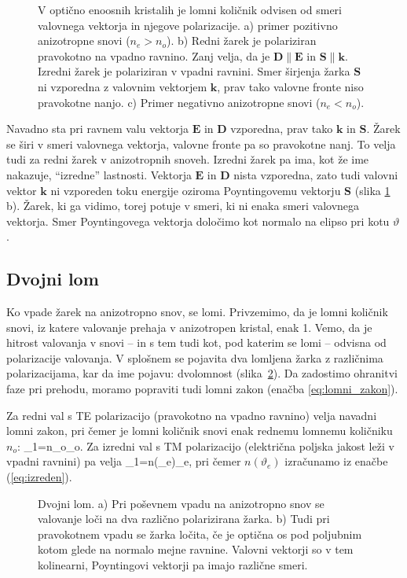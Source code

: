 \begin{figure}[h]
\centering
\def\svgwidth{140truemm} 

\caption{\label{fig:Elipsa}V optično enoosnih kristalih je lomni količnik odvisen
od smeri valovnega vektorja in njegove polarizacije. a) primer pozitivno anizotropne
snovi ($n_e>n_o$). b) Redni žarek je polariziran pravokotno na vpadno ravnino. Zanj velja, 
da je $\mathbf{D} \parallel \mathbf{E}$ in $\mathbf{S} \parallel \mathbf{k}$. Izredni žarek
je polariziran v vpadni ravnini. Smer širjenja žarka $\mathbf{S}$ ni vzporedna z valovnim vektorjem
$\mathbf{k}$,
prav tako valovne fronte niso pravokotne nanjo. c) Primer negativno anizotropne snovi ($n_e< n_o$).}
\end{figure}

Navadno sta pri ravnem valu vektorja $\mathbf{E}$ in $\mathbf{D}$ vzporedna, 
prav tako $\mathbf{k}$ in $\mathbf{S}$. Žarek se širi v smeri valovnega vektorja, 
valovne fronte pa so pravokotne nanj. To velja tudi za redni žarek v anizotropnih
snoveh. Izredni žarek pa ima, kot že ime nakazuje, ``izredne'' lastnosti. Vektorja
$\mathbf{E}$ in $\mathbf{D}$ nista vzporedna, zato tudi valovni vektor $\mathbf{k}$ ni vzporeden
toku energije oziroma Poyntingovemu vektorju $\mathbf{S}$ (slika \ref{fig:Elipsa}\,b). 
Žarek, ki ga vidimo, torej potuje v smeri, ki ni enaka smeri valovnega vektorja. Smer
Poyntingovega vektorja določimo kot normalo na elipso pri kotu $\vartheta$. 

\subsection*{Dvojni lom}
Ko vpade žarek na anizotropno snov, se lomi. Privzemimo, da je lomni količnik snovi,
iz katere valovanje prehaja v anizotropen kristal, enak 1. Vemo, da je hitrost valovanja v 
snovi -- in s tem tudi kot, pod katerim se lomi -- odvisna od polarizacije valovanja. V splošnem
se pojavita dva lomljena žarka z različnima polarizacijama, kar
da ime pojavu: dvolomnost (slika~\ref{fig:dvolomnost}). 
Da zadostimo ohranitvi faze
pri prehodu, moramo popraviti tudi lomni zakon (enačba \ref{eq:lomni_zakon}).

Za redni val s TE polarizacijo (pravokotno na vpadno ravnino) velja navadni lomni zakon, pri čemer
je lomni količnik snovi enak rednemu lomnemu količniku $n_o$:
\beq
\sin\vartheta_{1}=n_{o}\sin\vartheta_{o}.
\eeq
Za izredni val s TM polarizacijo (električna poljska jakost leži v vpadni ravnini) pa velja
\beq
\sin\vartheta_{1}=n(\vartheta_e)\sin\vartheta_{e},
\eeq
pri čemer $n(\vartheta_e)$ izračunamo iz enačbe (\ref{eq:izreden}).
\begin{figure}
\centering
\def\svgwidth{140truemm} 

\caption{\label{fig:dvolomnost}Dvojni lom. a) Pri poševnem vpadu na anizotropno snov se
valovanje loči na dva različno polarizirana žarka. b) Tudi pri pravokotnem vpadu se žarka 
ločita, če je optična os pod poljubnim kotom glede na normalo mejne ravnine. Valovni vektorji
so v tem kolinearni, Poyntingovi vektorji pa imajo različne smeri.}
\end{figure}

